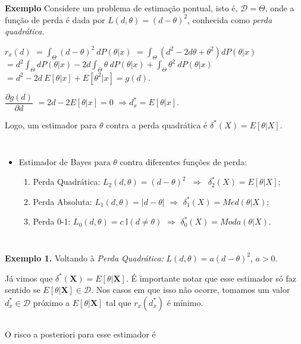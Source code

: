 \documentclass[
]{book}
\begin{document}
\(~\)

\textbf{Exemplo} Considere um problema de estimação pontual, isto é, \(\mathcal{D}=\Theta\), onde a função de perda é dada por \(L(d,\theta)=(d-\theta)^2\), conhecida como \emph{perda quadrática}.

\(r_x(d)\) \(=\displaystyle \int_\Theta(d-\theta)^2~dP(\theta|x)\)
\(=\displaystyle \int_\Theta \left(d^2 - 2d\theta + \theta^2\right) dP(\theta|x)\) \(=d^2\displaystyle\int_\Theta dP(\theta|x) - 2d\int_\Theta\theta ~dP(\theta|x) + \int_\Theta \theta^2 ~dP(\theta|x)\) \(=d^2-2d~E[\theta|x]+E[\theta^2|x]=g(d)\).

\(\dfrac{\partial g(d)}{\partial d}\) \(=2d-2E[\theta|x]=0\) \(\Rightarrow {d}_x^*=E[\theta|x]\).

Logo, um estimador para \(\theta\) contra a perda quadrática é \({\delta}^*(X)=E[\theta|X]\).

\(~\)

\(~\)

\begin{itemize}
\item
  Estimador de Bayes para \(\theta\) contra diferentes funções de perda:

  \begin{enumerate}
  \def\labelenumi{\arabic{enumi}.}
  \item
    Perda Quadrática: \(L_2(d,\theta)=(d-\theta)^2\) \(~\Longrightarrow~\) \({\delta}_2^*(X)=E[\theta|X]\);
  \item
    Perda Absoluta: \(L_1(d,\theta)=|d-\theta|\) \(\Longrightarrow\) \({\delta}_1^*(X)=Med(\theta|X)\);
  \item
    Perda 0-1: \(L_0(d,\theta)=c~\mathbb{I}(d\neq\theta)\) \(\Longrightarrow\) \({\delta}_0^*(X)=Moda(\theta|X)\).
  \end{enumerate}
\end{itemize}

\(~\)

\(~\)

\textbf{Exemplo 1.} Voltando à \emph{Perda Quadrática:} \(L(d,\theta)=a(d-\theta)^2\), \(a>0\).

Já vimos que \(\delta^*(\boldsymbol X)=E[\theta|\boldsymbol X]\). É importante notar que esse estimador só faz sentido se \(E[\theta|\boldsymbol X]\in \mathcal{D}\). Nos casos em que isso não ocorre, tomamos um valor \({d}_x^* \in \mathcal{D}\) próximo a \(E[\theta|\boldsymbol X]\) tal que \(r_x\left({d}_x^*\right)\) é mínimo.

\(~\)

O risco a posteriori para esse estimador é
\end{document}
